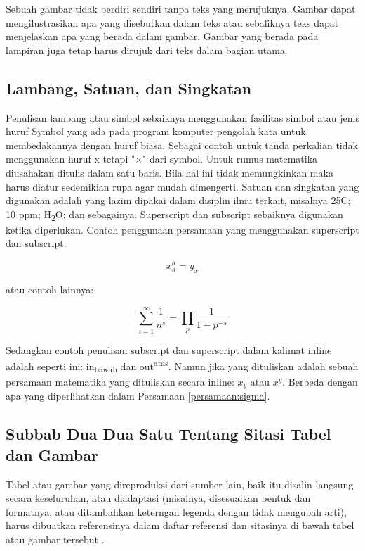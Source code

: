 Sebuah gambar tidak berdiri sendiri tanpa teks yang merujuknya. Gambar dapat mengilustrasikan apa yang disebutkan dalam teks atau sebaliknya teks dapat menjelaskan apa yang berada dalam gambar. Gambar yang berada pada lampiran juga tetap harus dirujuk dari teks dalam bagian utama.

\subsection{Lambang, Satuan, dan Singkatan}

Penulisan lambang atau simbol sebaiknya menggunakan fasilitas simbol atau jenis huruf Symbol yang ada pada program komputer pengolah kata untuk membedakannya dengan huruf biasa. Sebagai contoh untuk tanda perkalian tidak menggunakan huruf x tetapi "$\times$" dari symbol. Untuk rumus matematika diusahakan ditulis dalam satu baris. Bila hal ini tidak memungkinkan maka harus diatur sedemikian rupa agar mudah dimengerti.
Satuan dan singkatan yang digunakan adalah yang lazim dipakai dalam disiplin ilmu terkait, misalnya 25\degree C; 10 ppm; H\textsubscript{2}O; dan sebagainya. Superscript dan subscript sebaiknya digunakan ketika diperlukan. Contoh penggunaan persamaan yang menggunakan superscript dan subscript:

\begin{equation}
  x_a^b = y_x
\end{equation}

\noindent atau contoh lainnya:

\begin{equation}
  \sum_{i=1}^{\infty} \frac{1}{n^s} 
= \prod_p \frac{1}{1 - p^{-s}}
  \label{persamaan:sigma}
\end{equation}

Sedangkan contoh penulisan subscript dan superscript dalam kalimat inline adalah seperti ini: in\textsubscript{bawah} dan out\textsuperscript{atas}. Namun jika yang dituliskan adalah sebuah persamaan matematika yang dituliskan secara inline: $x_y$ atau $x^y$. Berbeda dengan apa yang diperlihatkan dalam Persamaan \ref{persamaan:sigma}.

\subsection{Subbab Dua Dua Satu Tentang Sitasi Tabel dan Gambar}

Tabel atau gambar yang direproduksi dari sumber lain, baik itu disalin langsung secara keseluruhan, atau diadaptasi (misalnya, disesuaikan bentuk dan formatnya, atau ditambahkan keterngan legenda dengan tidak mengubah arti), harus dibuatkan referensinya dalam daftar referensi dan sitasinya di bawah tabel atau gambar tersebut \citep{Bloggs1950}.

